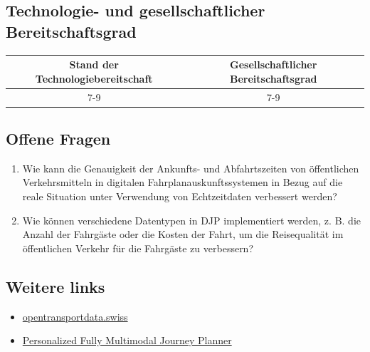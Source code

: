 \documentclass[
]{book}
\providecommand{\tightlist}{%
  \setlength{\itemsep}{0pt}\setlength{\parskip}{0pt}}
\begin{document}
\hypertarget{technologie--und-gesellschaftlicher-bereitschaftsgrad-17}{%
\subsection*{Technologie- und gesellschaftlicher Bereitschaftsgrad}\label{technologie--und-gesellschaftlicher-bereitschaftsgrad-17}}

\begin{longtable}[]{@{}cc@{}}
\toprule
Stand der Technologiebereitschaft & Gesellschaftlicher Bereitschaftsgrad\tabularnewline
\midrule
\endhead
7-9 & 7-9\tabularnewline
\bottomrule
\end{longtable}

\hypertarget{offene-fragen-20}{%
\subsection*{Offene Fragen}\label{offene-fragen-20}}

\begin{enumerate}
\def\labelenumi{\arabic{enumi}.}
\tightlist
\item
  Wie kann die Genauigkeit der Ankunfts- und Abfahrtszeiten von öffentlichen Verkehrsmitteln in digitalen Fahrplanauskunftssystemen in Bezug auf die reale Situation unter Verwendung von Echtzeitdaten verbessert werden?
\item
  Wie können verschiedene Datentypen in DJP implementiert werden, z. B. die Anzahl der Fahrgäste oder die Kosten der Fahrt, um die Reisequalität im öffentlichen Verkehr für die Fahrgäste zu verbessern?
\end{enumerate}

\hypertarget{weitere-links-16}{%
\subsection*{Weitere links}\label{weitere-links-16}}

\begin{itemize}
\tightlist
\item
  \href{https://opentransportdata.swiss/en/cookbook/open-journey-planner-ojp/}{opentransportdata.swiss}
\item
  \href{https://upcommons.upc.edu/bitstream/handle/2117/127282/FAIA263-1225\%20\%282\%29.pdf?sequence=3\&isAllowed=y}{Personalized Fully Multimodal Journey Planner}
\end{itemize}
\end{document}
